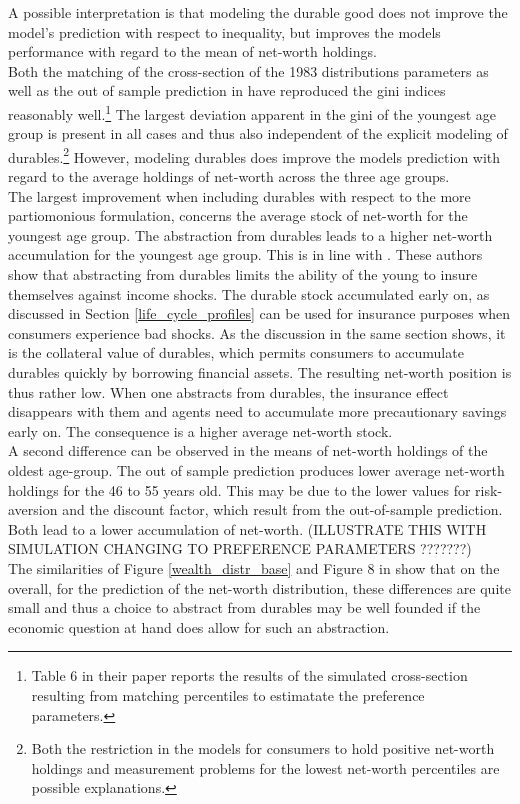 \documentclass[a4paper,12pt,legno]{article}
\begin{document}
A possible interpretation is that modeling the durable good does not improve the model's prediction with respect to inequality, but improves the models performance with regard to the mean of net-worth holdings. \\
 Both the matching of the cross-section of the 1983 distributions parameters as well as the out of sample prediction in \cite{hintermaier2011} have reproduced the gini indices reasonably well.\footnote{Table 6 in their paper reports the results of the simulated cross-section resulting from matching percentiles to estimatate the preference parameters.} The largest deviation apparent in the gini of the youngest age group is present in all cases and thus also independent of the explicit modeling of durables.\footnote{Both the restriction in the models for consumers to hold positive net-worth holdings and measurement problems for the lowest net-worth percentiles are possible explanations.} However, modeling durables does improve the models prediction with regard to the average holdings of net-worth across the three age groups. \\ The largest improvement when including durables with respect to the more partiomonious formulation, concerns the average stock of net-worth for the youngest age group. The abstraction from durables leads to a higher net-worth accumulation for the youngest age group. This is in line with \cite{FV&K2011}. These authors show that abstracting from durables limits the ability of the young to insure themselves against income shocks. The durable stock accumulated early on, as discussed in Section \ref{life_cycle_profiles} can be used for insurance purposes when consumers experience bad shocks. As the discussion in the same section shows, it is the collateral value of durables, which permits consumers to accumulate durables quickly by borrowing financial assets. The resulting net-worth position is thus rather low. When one abstracts from durables, the insurance effect disappears with them and agents need to accumulate more precautionary savings early on. The consequence is a higher average net-worth stock. \\ 
A second difference can be observed in the means of net-worth holdings of the oldest age-group. The out of sample prediction produces lower average net-worth holdings for the 46 to 55 years old. This may be due to the lower values for risk-aversion and the discount factor, which result from the out-of-sample prediction. Both lead to a lower accumulation of net-worth. (ILLUSTRATE THIS WITH SIMULATION CHANGING TO PREFERENCE PARAMETERS ???????)
\\
The similarities of Figure \ref{wealth_distr_base} and Figure 8 in \cite{hintermaier2011} show that on the overall, for the prediction of the net-worth distribution, these differences are quite small and thus a choice to abstract from durables may be well founded if the economic question at hand does allow for such an abstraction.  
\end{document}
